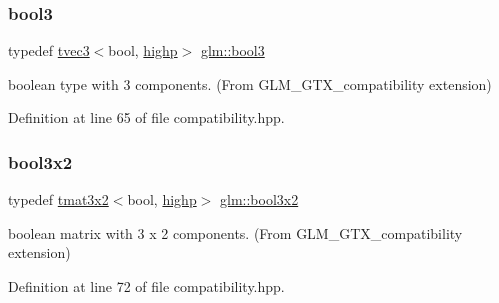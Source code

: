 \mbox{\label{group__gtx__compatibility_gab7658aa2e0688b8ac7e640cf7e405c1e}} 
\subsubsection{\texorpdfstring{bool3}{bool3}}
{\footnotesize\ttfamily typedef \mbox{\hyperlink{structglm_1_1tvec3}{tvec3}}$<$bool, \mbox{\hyperlink{namespaceglm_a0f04f086094c747d227af4425893f545ac6f7eab42eacbb10d59a58e95e362074}{highp}}$>$ \mbox{\hyperlink{group__gtx__compatibility_gab7658aa2e0688b8ac7e640cf7e405c1e}{glm\+::bool3}}}



boolean type with 3 components. (From G\+L\+M\+\_\+\+G\+T\+X\+\_\+compatibility extension) 



Definition at line 65 of file compatibility.\+hpp.

\mbox{\label{group__gtx__compatibility_ga6a944ad10139c8915bf72a832273ff02}} 
\subsubsection{\texorpdfstring{bool3x2}{bool3x2}}
{\footnotesize\ttfamily typedef \mbox{\hyperlink{structglm_1_1tmat3x2}{tmat3x2}}$<$bool, \mbox{\hyperlink{namespaceglm_a0f04f086094c747d227af4425893f545ac6f7eab42eacbb10d59a58e95e362074}{highp}}$>$ \mbox{\hyperlink{group__gtx__compatibility_ga6a944ad10139c8915bf72a832273ff02}{glm\+::bool3x2}}}



boolean matrix with 3 x 2 components. (From G\+L\+M\+\_\+\+G\+T\+X\+\_\+compatibility extension) 



Definition at line 72 of file compatibility.\+hpp.

\mbox{\label{group__gtx__compatibility_ga5c0ded80422867674cd651ab2261f2a3}} 
